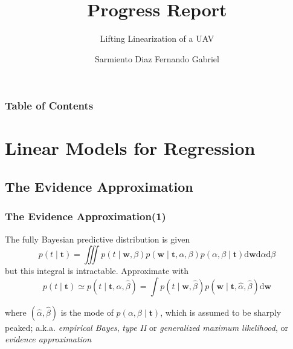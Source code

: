 \documentclass{beamer}
\title[Progress Report] %
{Progress Report}
\subtitle{Lifting Linearization of a UAV}
\author[Sarmiento Fernando] %
{Sarmiento Diaz Fernando Gabriel}
\institute[TITECH] %
{
  \inst{1}%
  Yamakita Laboratory\\
  Department of Systems and Control Engineering\\
  Tokyo Institute of Technology
}
\date[2021] %
\begin{document}
\frame{\titlepage}


\begin{frame}
    \frametitle{Table of Contents}
    \tableofcontents
\end{frame}

\section{Linear Models for Regression}
\subsection{The Evidence Approximation}
\begin{frame}
    \frametitle{The Evidence Approximation(1)}
    The fully Bayesian predictive distribution is given
    \begin{equation}
        p(t \mid \mathbf{t})=\iiint p(t \mid \mathbf{w}, \beta) p(\mathbf{w} \mid \mathbf{t}, \alpha, \beta) p(\alpha, \beta \mid \mathbf{t}) \mathrm{d} \mathbf{w} \mathrm{d} \alpha \mathrm{d} \beta
    \end{equation}
    but this integral is intractable. Approximate with
    \begin{equation}
        p(t \mid \mathbf{t}) \simeq p(t \mid \mathbf{t}, \widehat{\alpha}, \widehat{\beta})=\int p(t \mid \mathbf{w}, \widehat{\beta}) p(\mathbf{w} \mid \mathbf{t}, \widehat{\alpha}, \widehat{\beta}) \mathrm{d} \mathbf{w}
    \end{equation}

    where $(\widehat{\alpha}, \widehat{\beta})$ is the mode of $p(\alpha, \beta \mid \mathbf{t})$, which is assumed to be sharply peaked; a.k.a. \textit{empirical Bayes}, \textit{type II} or \textit{generalized maximum likelihood}, or \textit{evidence approximation}
    
\end{frame}
\end{document}
